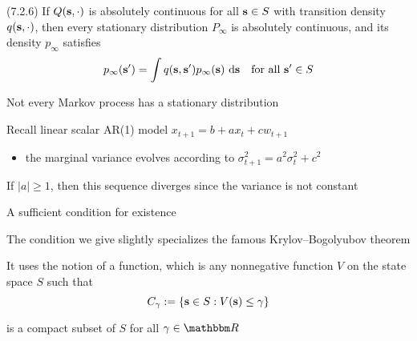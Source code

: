 \begin{frame}

    \vspace{2em}
    \Fact (7.2.6)
    If $Q({\mathbf s}, \cdot)$ is absolutely continuous for all ${\mathbf s} \in S$
    with transition density $q({\mathbf s}, \cdot)$, then every stationary
    distribution $P_\infty$ is absolutely continuous, and its density
    $p_\infty$ satisfies
    \begin{equation}
        \label{eq:dsdist}
        p_{\infty}({\mathbf s}') 
        = \int q({\mathbf s}, {\mathbf s}' ) p_{\infty}({\mathbf s}) \, \mathop{}\!\mathrm{d} {\mathbf s}
        \quad \text{for all } {\mathbf s}' \in S
    \end{equation}
\end{frame}

\begin{frame}
    
    \vspace{2em}
    Not every Markov process has a stationary distribution
    
    \vspace{1em}
    Recall linear scalar AR(1) model $x_{t+1} = b + a x_t + c w_{t+1}$
    \begin{itemize}
    \item the
    marginal variance evolves according to $\sigma^2_{t+1} = a^2 \sigma_t^2 +
    c^2$
    \end{itemize}
    
    \vspace{1em}
    If $|a| \geq 1$, then this sequence diverges since the variance is
    not constant
    
\end{frame}

\begin{frame}

    \vspace{2em}
    A sufficient condition for existence  
    
    The condition we give slightly specializes the famous Krylov--Bogolyubov theorem
    
    \vspace{1em}
    It uses the notion of a  function, which is any nonnegative
    function $V$ on the state space $S$ such that 
    \begin{equation*}
        C_\gamma := \{ {\mathbf s} \in S : V({\mathbf s}) \leq \gamma \}
    \end{equation*}
    
    is a compact subset of $S$ for all $\gamma \in \RR$
    
\end{frame}

